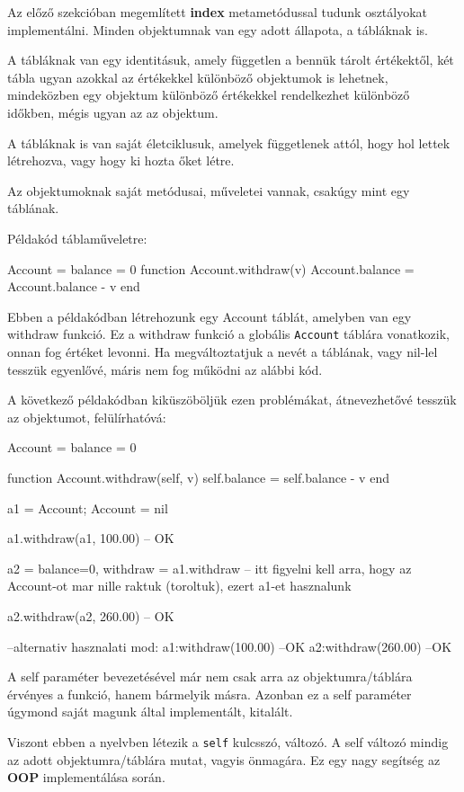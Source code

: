 Az előző szekcióban megemlített \detokenize{__}\textbf{index} metametódussal tudunk osztályokat implementálni. Minden objektumnak van egy adott állapota, a tábláknak is.

A tábláknak van egy identitásuk, amely független a bennük tárolt értékektől, két tábla ugyan azokkal az értékekkel különböző objektumok is lehetnek, mindeközben egy objektum különböző értékekkel rendelkezhet különböző időkben, mégis ugyan az az objektum.

A tábláknak is van saját életciklusuk, amelyek függetlenek attól, hogy hol lettek létrehozva, vagy hogy ki hozta őket létre.

Az objektumoknak saját metódusai, műveletei vannak, csakúgy mint egy táblának.

Példakód táblaműveletre:
\begin{lua}
Account = {balance = 0}
function Account.withdraw(v)
	Account.balance = Account.balance - v
end
\end{lua}
Ebben a példakódban létrehozunk egy Account táblát, amelyben van egy withdraw funkció. Ez a withdraw funkció a globális \texttt{Account} táblára vonatkozik, onnan fog értéket levonni. Ha megváltoztatjuk a nevét a táblának, vagy nil-lel tesszük egyenlővé, máris nem fog működni az alábbi kód.

A következő példakódban kiküszöböljük ezen problémákat, átnevezhetővé tesszük az objektumot, felülírhatóvá:

\begin{lua}
Account = {balance = 0}

function Account.withdraw(self, v)
	self.balance = self.balance - v
end 

a1 = Account; Account = nil

a1.withdraw(a1, 100.00)   -- OK

a2 = {balance=0, withdraw = a1.withdraw} -- itt figyelni kell arra, hogy az Account-ot mar nille raktuk (toroltuk), ezert a1-et hasznalunk 

a2.withdraw(a2, 260.00) -- OK

--alternativ hasznalati mod:
a1:withdraw(100.00) --OK
a2:withdraw(260.00) --OK
\end{lua}

A self paraméter bevezetésével már nem csak arra az objektumra/táblára érvényes a funkció, hanem bármelyik másra. Azonban ez a self paraméter úgymond saját magunk által implementált, kitalált.

Viszont ebben a nyelvben létezik a \texttt{self} kulcsszó, változó. A self változó mindig az adott objektumra/táblára mutat, vagyis önmagára. Ez egy nagy segítség az \textbf{OOP} implementálása során.

